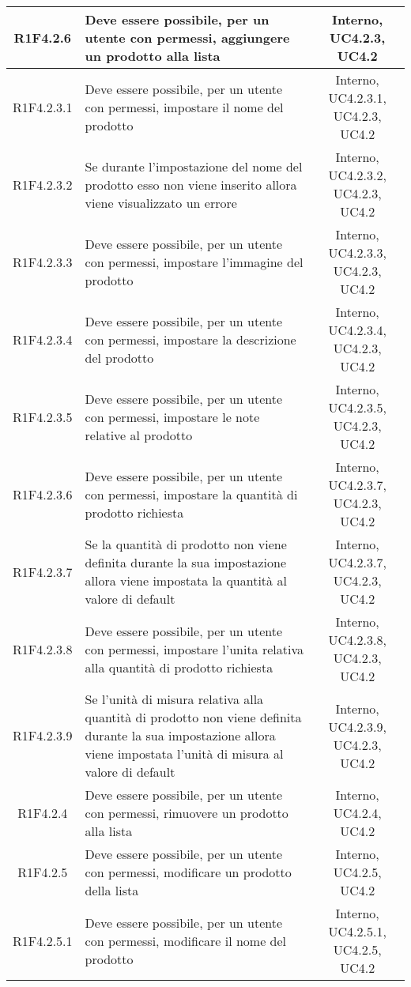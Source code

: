 \begin{longtable}{|c|>{\centering}m{7cm}|c|}
			\hline
			R1F4.2.6 & Deve essere possibile, per un utente con permessi, aggiungere un prodotto alla lista & Interno, UC4.2.3, UC4.2 \\
			\hline
			R1F4.2.3.1 & Deve essere possibile, per un utente con permessi, impostare il nome del prodotto & Interno, UC4.2.3.1, UC4.2.3, UC4.2 \\
			\hline
			R1F4.2.3.2 & Se durante l'impostazione del nome del prodotto esso non viene inserito allora viene visualizzato un errore & Interno, UC4.2.3.2, UC4.2.3, UC4.2 \\
			\hline
			R1F4.2.3.3 & Deve essere possibile, per un utente con permessi, impostare l'immagine del prodotto & Interno, UC4.2.3.3, UC4.2.3, UC4.2 \\
			\hline
			R1F4.2.3.4 & Deve essere possibile, per un utente con permessi, impostare la descrizione del prodotto & Interno, UC4.2.3.4, UC4.2.3, UC4.2 \\
			\hline
			R1F4.2.3.5 & Deve essere possibile, per un utente con permessi, impostare le note relative al prodotto & Interno, UC4.2.3.5, UC4.2.3, UC4.2 \\
			\hline
			R1F4.2.3.6 & Deve essere possibile, per un utente con permessi, impostare la quantità di prodotto richiesta & Interno, UC4.2.3.7, UC4.2.3, UC4.2 \\
			\hline
			R1F4.2.3.7 & Se la quantità di prodotto non viene definita durante la sua impostazione allora viene impostata la quantità al valore di default & Interno, UC4.2.3.7, UC4.2.3, UC4.2 \\
			\hline
			R1F4.2.3.8 & Deve essere possibile, per un utente con permessi, impostare l'unita relativa alla quantità di prodotto richiesta & Interno, UC4.2.3.8, UC4.2.3, UC4.2 \\
			\hline
			R1F4.2.3.9 & Se l'unità di misura relativa alla quantità di prodotto non viene definita durante la sua impostazione allora viene impostata l'unità di misura al valore di default & Interno, UC4.2.3.9, UC4.2.3, UC4.2 \\
			\hline
			R1F4.2.4 & Deve essere possibile, per un utente con permessi, rimuovere un prodotto alla lista & Interno, UC4.2.4, UC4.2 \\
			\hline
			R1F4.2.5 & Deve essere possibile, per un utente con permessi, modificare un prodotto della lista & Interno, UC4.2.5, UC4.2 \\
			\hline
			R1F4.2.5.1 & Deve essere possibile, per un utente con permessi, modificare il nome del prodotto & Interno, UC4.2.5.1, UC4.2.5, UC4.2 \\

\end{longtable}

